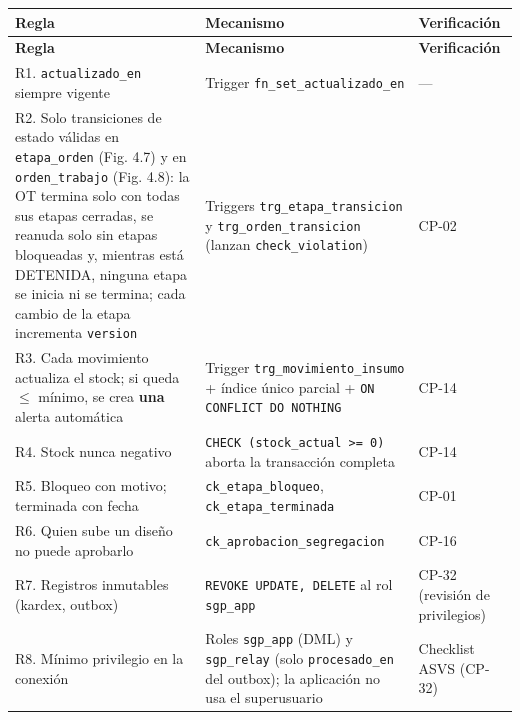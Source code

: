 \documentclass[11pt,a4paper]{article}
\begin{document}
\begingroup
\begin{longtable}{@{}>{\raggedright\arraybackslash\hspace{0pt}}p{}>{\raggedright\arraybackslash\hspace{0pt}}p{}>{\raggedright\arraybackslash\hspace{0pt}}p{}@{}}
\toprule
\textbf{Regla} & \textbf{Mecanismo} & \textbf{Verificación} \\ \midrule
\endfirsthead
\toprule
\textbf{Regla} & \textbf{Mecanismo} & \textbf{Verificación} \\ \midrule
\endhead
\bottomrule
\endlastfoot
R1. \texttt{actualizado\_\allowbreak{}en} siempre vigente & Trigger \texttt{fn\_\allowbreak{}set\_\allowbreak{}actualizado\_\allowbreak{}en} & \mbox{---} \\ \addlinespace[0.25em]
R2. Solo transiciones de estado válidas en \texttt{etapa\_\allowbreak{}orden} (Fig. 4.7) y en \texttt{orden\_\allowbreak{}trabajo} (Fig. 4.8): la OT termina solo con todas sus etapas cerradas, se reanuda solo sin etapas bloqueadas y, mientras está DETENIDA, ninguna etapa se inicia ni se termina; cada cambio de la etapa incrementa \texttt{version} & Triggers \texttt{trg\_\allowbreak{}etapa\_\allowbreak{}transicion} y \texttt{trg\_\allowbreak{}orden\_\allowbreak{}transicion} (lanzan \texttt{check\_\allowbreak{}violation}) & \mbox{CP-02} \\ \addlinespace[0.25em]
R3. Cada movimiento actualiza el stock; si queda \ensuremath{\leq} mínimo, se crea \textbf{una} alerta automática & Trigger \texttt{trg\_\allowbreak{}movimiento\_\allowbreak{}insumo} + índice único parcial + \texttt{ON CONFLICT DO NOTHING} & \mbox{CP-14} \\ \addlinespace[0.25em]
R4. Stock nunca negativo & \texttt{CHECK (stock\_\allowbreak{}actual >= 0)} aborta la transacción completa & \mbox{CP-14} \\ \addlinespace[0.25em]
R5. Bloqueo con motivo; terminada con fecha & \texttt{ck\_\allowbreak{}etapa\_\allowbreak{}bloqueo}, \texttt{ck\_\allowbreak{}etapa\_\allowbreak{}terminada} & \mbox{CP-01} \\ \addlinespace[0.25em]
R6. Quien sube un diseño no puede aprobarlo & \texttt{ck\_\allowbreak{}aprobacion\_\allowbreak{}segregacion} & \mbox{CP-16} \\ \addlinespace[0.25em]
R7. Registros inmutables (kardex, outbox) & \texttt{REVOKE UPDATE, DELETE} al rol \texttt{sgp\_\allowbreak{}app} & \mbox{CP-32} (revisión de privilegios) \\ \addlinespace[0.25em]
R8. Mínimo privilegio en la conexión & Roles \texttt{sgp\_\allowbreak{}app} (DML) y \texttt{sgp\_\allowbreak{}relay} (solo \texttt{procesado\_\allowbreak{}en} del outbox); la aplicación no usa el superusuario & Checklist ASVS (\mbox{CP-32}) \\
\end{longtable}
\endgroup
\end{document}
